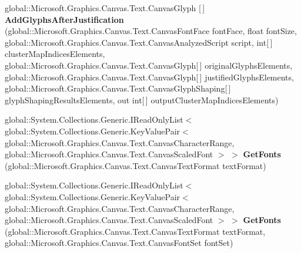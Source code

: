 \begin{DoxyCompactItemize}
\item 
\mbox{\label{interface_microsoft_1_1_graphics_1_1_canvas_1_1_text_1_1_i_canvas_text_analyzer_a9d0678a1c679966f39ef4b914bbc869a}} 
global\+::\+Microsoft.\+Graphics.\+Canvas.\+Text.\+Canvas\+Glyph \mbox{[}$\,$\mbox{]} {\bfseries Add\+Glyphs\+After\+Justification} (global\+::\+Microsoft.\+Graphics.\+Canvas.\+Text.\+Canvas\+Font\+Face font\+Face, float font\+Size, global\+::\+Microsoft.\+Graphics.\+Canvas.\+Text.\+Canvas\+Analyzed\+Script script, int\mbox{[}$\,$\mbox{]} cluster\+Map\+Indices\+Elements, global\+::\+Microsoft.\+Graphics.\+Canvas.\+Text.\+Canvas\+Glyph\mbox{[}$\,$\mbox{]} original\+Glyphs\+Elements, global\+::\+Microsoft.\+Graphics.\+Canvas.\+Text.\+Canvas\+Glyph\mbox{[}$\,$\mbox{]} justified\+Glyphs\+Elements, global\+::\+Microsoft.\+Graphics.\+Canvas.\+Text.\+Canvas\+Glyph\+Shaping\mbox{[}$\,$\mbox{]} glyph\+Shaping\+Results\+Elements, out int\mbox{[}$\,$\mbox{]} output\+Cluster\+Map\+Indices\+Elements)
\item 
\mbox{\label{interface_microsoft_1_1_graphics_1_1_canvas_1_1_text_1_1_i_canvas_text_analyzer_aeef37c4db68a938f3d62ba8dbfaeed81}} 
global\+::\+System.\+Collections.\+Generic.\+I\+Read\+Only\+List$<$ global\+::\+System.\+Collections.\+Generic.\+Key\+Value\+Pair$<$ global\+::\+Microsoft.\+Graphics.\+Canvas.\+Text.\+Canvas\+Character\+Range, global\+::\+Microsoft.\+Graphics.\+Canvas.\+Text.\+Canvas\+Scaled\+Font $>$ $>$ {\bfseries Get\+Fonts} (global\+::\+Microsoft.\+Graphics.\+Canvas.\+Text.\+Canvas\+Text\+Format text\+Format)
\item 
\mbox{\label{interface_microsoft_1_1_graphics_1_1_canvas_1_1_text_1_1_i_canvas_text_analyzer_afe87e79f1d9d43241df23f2f1835733d}} 
global\+::\+System.\+Collections.\+Generic.\+I\+Read\+Only\+List$<$ global\+::\+System.\+Collections.\+Generic.\+Key\+Value\+Pair$<$ global\+::\+Microsoft.\+Graphics.\+Canvas.\+Text.\+Canvas\+Character\+Range, global\+::\+Microsoft.\+Graphics.\+Canvas.\+Text.\+Canvas\+Scaled\+Font $>$ $>$ {\bfseries Get\+Fonts} (global\+::\+Microsoft.\+Graphics.\+Canvas.\+Text.\+Canvas\+Text\+Format text\+Format, global\+::\+Microsoft.\+Graphics.\+Canvas.\+Text.\+Canvas\+Font\+Set font\+Set)
\item 

\end{DoxyCompactItemize}
